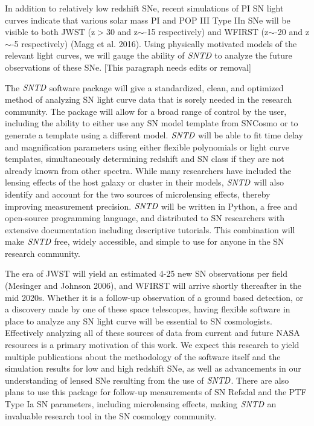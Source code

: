 In addition to relatively low redshift SNe, recent simulations of PI
SN light curves indicate that various solar mass PI and POP III Type
IIn SNe will be visible to both JWST (z$>$30 and z$\sim$-15
respectively) and WFIRST (z$\sim$-20 and z$\sim$-5 respectively) (Magg
et al. 2016). Using physically motivated models of the relevant light
curves, we will gauge the ability of $\textit{SNTD}$ to analyze the
future observations of these SNe. [This paragraph needs edits or
removal]


The $\textit{SNTD}$ software package will give a standardized, clean,
and optimized method of analyzing SN light curve data that is sorely
needed in the research community. The package will allow for a broad
range of control by the user, including the ability to either use any
SN model template from SNCosmo or to generate a template using a
different model. $\textit{SNTD}$ will be able to fit time delay and
magnification parameters using either flexible polynomials or light
curve templates, simultaneously determining redshift and SN class if
they are not already known from other spectra. While many researchers
have included the lensing effects of the host galaxy or cluster in
their models, $\textit{SNTD}$ will also identify and account for the
two sources of microlensing effects, thereby improving measurement
precision. $\textit{SNTD}$ will be written in Python, a free and
open-source programming language, and distributed to SN researchers
with extensive documentation including descriptive tutorials. This
combination will make $\textit{SNTD}$ free, widely accessible, and
simple to use for anyone in the SN research community.

The era of JWST will yield an estimated 4-25 new SN observations per
field (Mesinger and Johnson 2006), and WFIRST will arrive shortly
thereafter in the mid 2020s. Whether it is a follow-up observation of
a ground based detection, or a discovery made by one of these space
telescopes, having flexible software in place to analyze any SN light
curve will be essential to SN cosmologists. Effectively analyzing all
of these sources of data from current and future NASA resources is a
primary motivation of this work. We expect this research to yield
multiple publications about the methodology of the software itself and
the simulation results for low and high redshift SNe, as well as
advancements in our understanding of lensed SNe resulting from the use
of $\textit{SNTD}$. There are also plans to use this package for
follow-up measurements of SN Refsdal and the PTF Type Ia SN
parameters, including microlensing effects, making $\textit{SNTD}$ an
invaluable research tool in the SN cosmology
community. 

